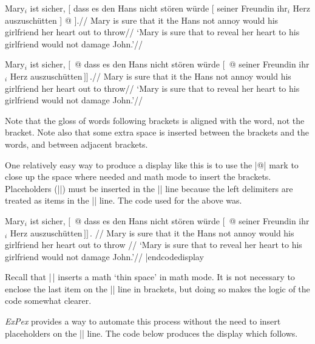 \smallskip
\framedisplay \makeatletter
\ex[glstyle=wrap,glbrackwordsep=.1em,glbrackbracksep=.0em]
\begingl
\gla Mary$_i$ ist sicher, [ dass es den Hans nicht st\"oren
w\"urde [ seiner Freundin ihr$_i$ Herz auszusch\"utten ] @ $].$//
\glb Mary is sure that it the Hans not annoy would
his girlfriend her heart {out to throw}//
\glft `Mary is sure that to reveal her heart to his girlfriend
would not damage John.'//
\endgl
\xe
\endframedisplay
\smallskip

\framedisplay
\ex[glstyle=wrap]
\begingl
\gla Mary$_i$ ist sicher, $[\,$ @ dass es den Hans nicht st\"oren
w\"urde $[\,$ @ seiner Freundin ihr$_i$ Herz auszusch\"utten$\,]]\,.$//
\glb Mary is sure {} that it the Hans not annoy would
{} his girlfriend her heart {out to throw}//
\glft `Mary is sure that to reveal her heart to his girlfriend
would not damage John.'//
\endgl
\xe
\endframedisplay
\smallskip

\noindent Note that the gloss of words following brackets is
aligned with the word, not the bracket.  Note also that some
extra space is inserted between the brackets and the words, and
between adjacent brackets.

One relatively easy way to produce a display like this is to use
the |@| mark to close up the space where needed and math mode to
insert the brackets.  Placeholders (|{}|) must be inserted in the
|\glb| line because the left delimiters are treated as items in
the |\gla| line.  The code used for the above was.

\codedisplay
\ex[glstyle=wrap]
\begingl
\gla Mary$_i$ ist sicher, $[\,$ @ dass es den Hans nicht st\"oren
w\"urde $[\,$ @ seiner Freundin ihr$_i$ Herz
{auszusch\"utten$\,]]\,.$} //
\glb Mary is sure {} that it the Hans not annoy would {} his
girlfriend her heart {out to throw} //
\glft `Mary is sure that to reveal her heart to his girlfriend
would not damage John.'//
\endgl
\xe
|endcodedisplay

\noindent Recall that |\,| inserts a math `thin space' in math
mode. It is not necessary to enclose the last item on the |\gla|
line in brackets, but doing so makes the logic of the code
somewhat clearer.

{\it ExPex\/} provides a way to automate this process without the
need to insert placeholders on the |\glb| line. The code below
produces the display which follows.

